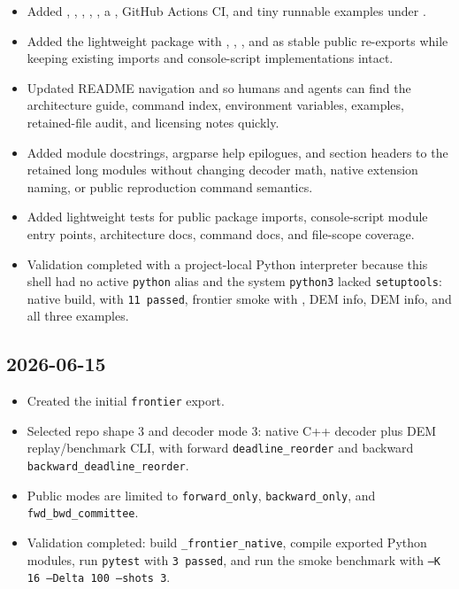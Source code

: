\begin{itemize}
\item Added \texttt{}, \texttt{}, \texttt{}, \texttt{}, \texttt{}, a \texttt{}, GitHub Actions CI, and tiny runnable examples under \texttt{}.
\item Added the lightweight \texttt{} package with \texttt{}, \texttt{}, \texttt{}, and \texttt{} as stable public re-exports while keeping existing \texttt{} imports and console-script implementations intact.
\item Updated README navigation and \texttt{} so humans and agents can find the architecture guide, command index, environment variables, examples, retained-file audit, and licensing notes quickly.
\item Added module docstrings, argparse help epilogues, and section headers to the retained long \texttt{} modules without changing decoder math, native extension naming, or public reproduction command semantics.
\item Added lightweight tests for public package imports, console-script module entry points, architecture docs, command docs, and file-scope coverage.
\item Validation completed with a project-local Python interpreter because this shell had no active \texttt{python} alias and the system \texttt{python3} lacked \texttt{setuptools}: native build, \texttt{} with \texttt{11 passed}, frontier smoke with \texttt{}, \texttt{} DEM info, \texttt{} DEM info, and all three examples.
\end{itemize}

\subsection*{2026-06-15}

\begin{itemize}
\item Created the initial \texttt{frontier} export.
\item Selected repo shape 3 and decoder mode 3: native C++ decoder plus DEM replay/benchmark CLI, with forward \texttt{deadline\_reorder} and backward \texttt{backward\_deadline\_reorder}.
\item Public modes are limited to \texttt{forward\_only}, \texttt{backward\_only}, and \texttt{fwd\_bwd\_committee}.
\item Validation completed: build \texttt{\_frontier\_native}, compile exported Python modules, run \texttt{pytest} with \texttt{3 passed}, and run the smoke benchmark with \texttt{--K 16 --Delta 100 --shots 3}.
\end{itemize}

